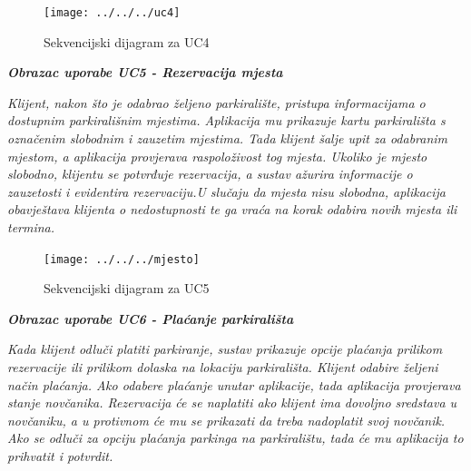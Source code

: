 				       \begin{figure}[hbt!]
				    	   \centering
				    	   \texttt{[image: ../../../uc4]}
				    	   \caption{Sekvencijski dijagram za UC4}
				        	\label{fig:uc4}
				       \end{figure}
				    
				    
				    
				    
				    
				    
				   \textbf{\textit{Obrazac uporabe UC5 - Rezervacija mjesta}}
				   
				   
				  
				   \textit{Klijent, nakon što je odabrao željeno parkiralište, pristupa informacijama o dostupnim parkirališnim mjestima. Aplikacija mu prikazuje kartu parkirališta s označenim slobodnim i zauzetim mjestima. Tada klijent šalje upit za odabranim mjestom, a aplikacija provjerava raspoloživost tog mjesta. Ukoliko je mjesto slobodno, klijentu se potvrđuje rezervacija, a sustav ažurira informacije o zauzetosti i evidentira rezervaciju.U slučaju da mjesta nisu slobodna, aplikacija obavještava klijenta o nedostupnosti te ga vraća na korak odabira novih mjesta ili termina.}
				   
				   \pagebreak
				   
				   
				   
				   
				    \begin{figure}[hbt!]
				    	\centering
				    	\texttt{[image: ../../../mjesto]}
				    	\caption{Sekvencijski dijagram za UC5}
				    	\label{fig:mjesto}
				    \end{figure}
				    
				    
				    
				    
				    
				    
				    
				    
				    
				    
			     	
				    \textbf{\textit{Obrazac uporabe UC6 - Plaćanje parkirališta}}
				    				
				     \textit{Kada klijent odluči platiti parkiranje, sustav prikazuje opcije plaćanja prilikom rezervacije ili prilikom dolaska na lokaciju parkirališta. Klijent odabire željeni način plaćanja. Ako odabere plaćanje unutar aplikacije, tada aplikacija provjerava stanje novčanika. Rezervacija će se naplatiti ako klijent ima dovoljno sredstava u novčaniku, a u protivnom će mu se prikazati da treba nadoplatit svoj novčanik. Ako se odluči za opciju plaćanja parkinga na parkiralištu, tada će mu aplikacija to prihvatit i potvrdit.}
				     
